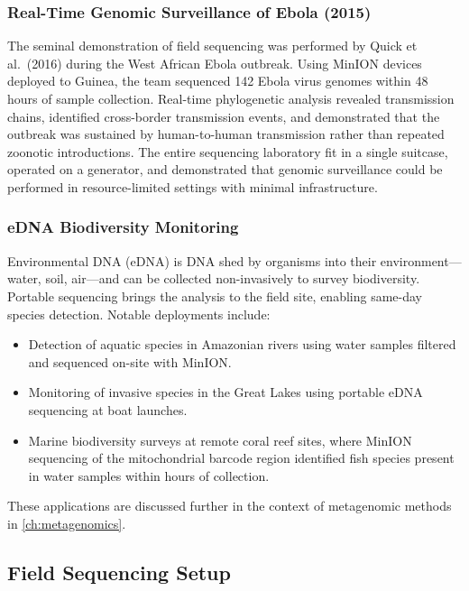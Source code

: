 \subsubsection{Real-Time Genomic Surveillance of Ebola (2015)}

The seminal demonstration of field sequencing was performed by Quick et al.\ (2016) during the West African Ebola outbreak. Using MinION devices deployed to Guinea, the team sequenced 142 Ebola virus genomes within 48 hours of sample collection. Real-time phylogenetic analysis revealed transmission chains, identified cross-border transmission events, and demonstrated that the outbreak was sustained by human-to-human transmission rather than repeated zoonotic introductions. The entire sequencing laboratory fit in a single suitcase, operated on a generator, and demonstrated that genomic surveillance could be performed in resource-limited settings with minimal infrastructure.

\subsubsection{eDNA Biodiversity Monitoring}

Environmental DNA (eDNA) is DNA shed by organisms into their environment---water, soil, air---and can be collected non-invasively to survey biodiversity. Portable sequencing brings the analysis to the field site, enabling same-day species detection. Notable deployments include:

\begin{itemize}[itemsep=2pt]
  \item Detection of aquatic species in Amazonian rivers using water samples filtered and sequenced on-site with MinION.
  \item Monitoring of invasive species in the Great Lakes using portable eDNA sequencing at boat launches.
  \item Marine biodiversity surveys at remote coral reef sites, where MinION sequencing of the mitochondrial  barcode region identified fish species present in water samples within hours of collection.
\end{itemize}

These applications are discussed further in the context of metagenomic methods in \cref{ch:metagenomics}.

\subsection{Field Sequencing Setup}
\label{subsec:accessible:fieldsetup}

